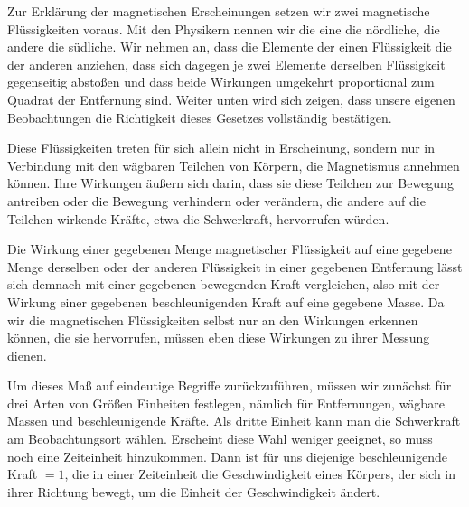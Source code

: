 Zur Erklärung der magnetischen Erscheinungen setzen wir zwei magnetische Flüssigkeiten voraus. Mit den Physikern nennen wir die eine die nördliche, die andere die südliche. Wir nehmen an, dass die Elemente der einen Flüssigkeit die der anderen anziehen, dass sich dagegen je zwei Elemente derselben Flüssigkeit gegenseitig abstoßen und dass beide Wirkungen umgekehrt proportional zum Quadrat der Entfernung sind. Weiter unten wird sich zeigen, dass unsere eigenen Beobachtungen die Richtigkeit dieses Gesetzes vollständig bestätigen.

Diese Flüssigkeiten treten für sich allein nicht in Erscheinung, sondern nur in Verbindung mit den wägbaren Teilchen von Körpern, die Magnetismus annehmen können. Ihre Wirkungen äußern sich darin, dass sie diese Teilchen zur Bewegung antreiben oder die Bewegung verhindern oder verändern, die andere auf die Teilchen wirkende Kräfte, etwa die Schwerkraft, hervorrufen würden.

Die Wirkung einer gegebenen Menge magnetischer Flüssigkeit auf eine gegebene Menge derselben oder der anderen Flüssigkeit in einer gegebenen Entfernung lässt sich demnach mit einer gegebenen bewegenden Kraft vergleichen, also mit der Wirkung einer gegebenen beschleunigenden Kraft auf eine gegebene Masse. Da wir die magnetischen Flüssigkeiten selbst nur an den Wirkungen erkennen können, die sie hervorrufen, müssen eben diese Wirkungen zu ihrer Messung dienen.

Um dieses Maß auf eindeutige Begriffe zurückzuführen, müssen wir zunächst für drei Arten von Größen Einheiten festlegen, nämlich für Entfernungen, wägbare Massen und beschleunigende Kräfte. Als dritte Einheit kann man die Schwerkraft am Beobachtungsort wählen. Erscheint diese Wahl weniger geeignet, so muss noch eine Zeiteinheit hinzukommen. Dann ist für uns diejenige beschleunigende Kraft $=1$, die in einer Zeiteinheit die Geschwindigkeit eines Körpers, der sich in ihrer Richtung bewegt, um die Einheit der Geschwindigkeit ändert.

